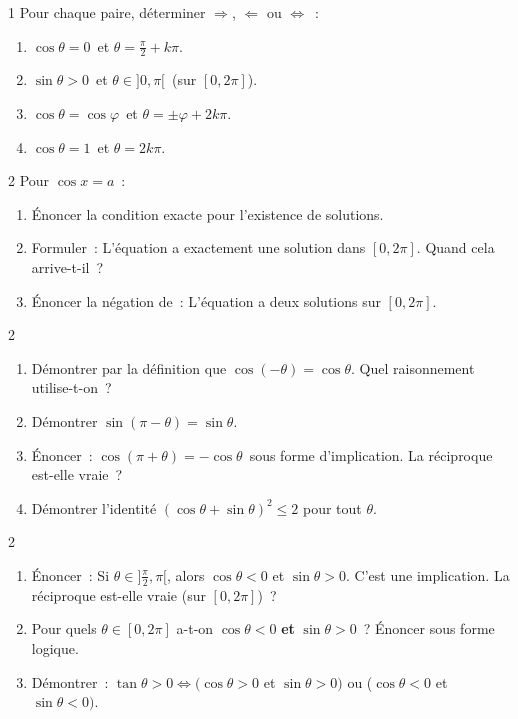 \begin{exo}{1}
Pour chaque paire, d\'eterminer $\Rightarrow$, $\Leftarrow$ ou $\Leftrightarrow$~:
\begin{enumerate}
  \item \og $\cos\theta=0$\fg\ et \og $\theta=\frac{\pi}{2}+k\pi$\fg.
  \item \og $\sin\theta>0$\fg\ et \og $\theta\in]0,\pi[$\fg\ (sur $[0,2\pi]$).
  \item \og $\cos\theta=\cos\varphi$\fg\ et \og $\theta=\pm\varphi+2k\pi$\fg.
  \item \og $\cos\theta=1$\fg\ et \og $\theta=2k\pi$\fg.
\end{enumerate}
\end{exo}

\begin{exo}{2}
Pour $\cos x = a$~:
\begin{enumerate}
  \item \'Enoncer la condition exacte pour l'existence de solutions.
  \item Formuler~: \og L'\'equation a exactement une solution dans $[0,2\pi]$\fg.
        Quand cela arrive-t-il~?
  \item \'Enoncer la n\'egation de~: \og L'\'equation a deux solutions sur $[0,2\pi]$\fg.
\end{enumerate}
\end{exo}

\begin{exo}{2}
\begin{enumerate}
  \item D\'emontrer par la d\'efinition que $\cos(-\theta)=\cos\theta$.
        Quel raisonnement utilise-t-on~?
  \item D\'emontrer $\sin(\pi-\theta)=\sin\theta$.
  \item \'Enoncer~: \og $\cos(\pi+\theta)=-\cos\theta$\fg\ sous forme d'implication.
        La r\'eciproque est-elle vraie~?
  \item D\'emontrer l'identit\'e $(\cos\theta+\sin\theta)^2\leq2$ pour tout $\theta$.
\end{enumerate}
\end{exo}

\begin{exo}{2}
\begin{enumerate}
  \item \'Enoncer~: \og Si $\theta\in]\frac{\pi}{2},\pi[$, alors $\cos\theta<0$ et $\sin\theta>0$.\fg
        C'est une implication. La r\'eciproque est-elle vraie (sur $[0,2\pi]$)~?
  \item Pour quels $\theta\in[0,2\pi]$ a-t-on $\cos\theta<0$ \textbf{et} $\sin\theta>0$~?
        \'Enoncer sous forme logique.
  \item D\'emontrer~: $\tan\theta>0 \Leftrightarrow (\cos\theta>0$ et $\sin\theta>0)$
        ou ($\cos\theta<0$ et $\sin\theta<0)$.
\end{enumerate}
\end{exo}

